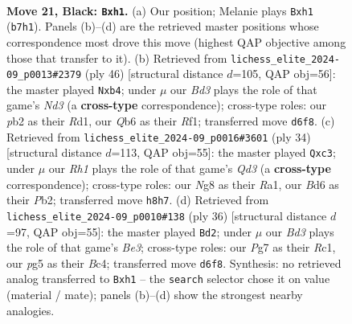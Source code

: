 \documentclass[11pt]{article}
\begin{document}
\clearpage

\begin{figure}[p]\centering
\begin{subfigure}{0.46\textwidth}\centering
\resizebox{\linewidth}{!}{%
\newchessgame
\chessboard[
  setfen={3k2nr/1br3p1/pq1b2Q1/2p3Pp/5P1P/2P4R/PP6/RNB1K2B b Q - 2 21},
  showmover=false,
  pgfstyle=straightmove, color=movearrow, markmove={b7-h1}
]}
\caption{}
\end{subfigure}\hfill
\begin{subfigure}{0.46\textwidth}\centering
\resizebox{\linewidth}{!}{%
\newchessgame
\chessboard[
  setfen={r4nk1/pb2r1p1/1p2pp1p/1B6/1b1qP2B/3N4/P3QPPP/3R1RK1 w - - 0 24},
  showmover=false,
  pgfstyle=straightmove, color=movearrow, markmove={d3-b4}
]}
\caption{}
\end{subfigure}
\\[4pt]
\begin{subfigure}{0.46\textwidth}\centering
\resizebox{\linewidth}{!}{%
\newchessgame
\chessboard[
  setfen={rn3rk1/pp3p2/2pP1pp1/6q1/6P1/1BbQ3P/PPP2P2/R4RK1 w - - 0 18},
  showmover=false,
  pgfstyle=straightmove, color=movearrow, markmove={d3-c3}
]}
\caption{}
\end{subfigure}\hfill
\begin{subfigure}{0.46\textwidth}\centering
\resizebox{\linewidth}{!}{%
\newchessgame
\chessboard[
  setfen={r1b1k2r/pp3p2/2n1p1pp/2P1P3/2Bp4/q3B1Q1/5PPP/2R1R1K1 w kq - 2 19},
  showmover=false,
  pgfstyle=straightmove, color=movearrow, markmove={e3-d2}
]}
\caption{}
\end{subfigure}
\caption{\textbf{Move 21, Black: \texttt{Bxh1}.} (a) Our position; Melanie plays \texttt{Bxh1} (\texttt{b7h1}). Panels (b)--(d) are the retrieved master positions whose correspondence most drove this move (highest QAP objective among those that transfer to it). (b) Retrieved from \texttt{lichess\_elite\_2024-09\_p0013\#2379} (ply 46) [structural distance $d$=105, QAP obj=56]: the master played \texttt{Nxb4}; under $\mu$ our \emph{Bd3} plays the role of that game's \emph{Nd3} (a \textbf{cross-type} correspondence); cross-type roles: our \emph{p}b2 as their \emph{R}d1, our \emph{Q}b6 as their \emph{R}f1; transferred move \texttt{d6f8}. (c) Retrieved from \texttt{lichess\_elite\_2024-09\_p0016\#3601} (ply 34) [structural distance $d$=113, QAP obj=55]: the master played \texttt{Qxc3}; under $\mu$ our \emph{Rh1} plays the role of that game's \emph{Qd3} (a \textbf{cross-type} correspondence); cross-type roles: our \emph{N}g8 as their \emph{R}a1, our \emph{B}d6 as their \emph{P}b2; transferred move \texttt{h8h7}. (d) Retrieved from \texttt{lichess\_elite\_2024-09\_p0010\#138} (ply 36) [structural distance $d$=97, QAP obj=55]: the master played \texttt{Bd2}; under $\mu$ our \emph{Bd3} plays the role of that game's \emph{Be3}; cross-type roles: our \emph{P}g7 as their \emph{R}c1, our \emph{p}g5 as their \emph{B}c4; transferred move \texttt{d6f8}. Synthesis: no retrieved analog transferred to \texttt{Bxh1} -- the \texttt{search} selector chose it on value (material / mate); panels (b)--(d) show the strongest nearby analogies.}
\label{fig:thought-m41}
\end{figure}
\end{document}
